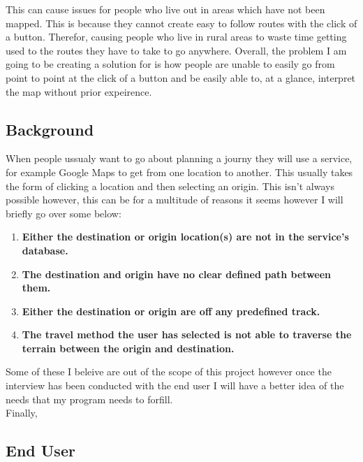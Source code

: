 \begin{flushleft}
        This can cause issues for people who live out in areas which have not been mapped. This is because they cannot create easy to follow routes with the click of a button. Therefor, 
        causing people who live in rural areas to waste time getting used to the routes they have to take to go anywhere. Overall, the problem I am going to be creating a solution for is 
        how people are unable to easily go from point to point at the click of a button and be easily able to, at a glance, interpret the map without prior expeirence. \\

        \subsection{Background}
        \bk
        When people ussualy want to go about planning a journy they will use a service, for example Google Maps to get from one location to another. This usually takes the form of clicking 
        a location and then selecting an origin. This isn't always possible however, this can be for a multitude of reasons it seems however I will briefly go over some below:\\
        
        \begin{enumerate}
            \item \textbf{Either the destination or origin location(s) are not in the service's database.}
            \item \textbf{The destination and origin have no clear defined path between them.}
            \item \textbf{Either the destination or origin are off any predefined track.}
            \item \textbf{The travel method the user has selected is not able to traverse the terrain between the origin and destination.}
        \end{enumerate}

        \bk
        Some of these I beleive are out of the scope of this project however once the interview has been conducted with the end user I will have a better idea of the needs that my program needs to forfill.\\

        \bk
        Finally, 

        \bk
        
        \subsection{End User}

\end{flushleft}
